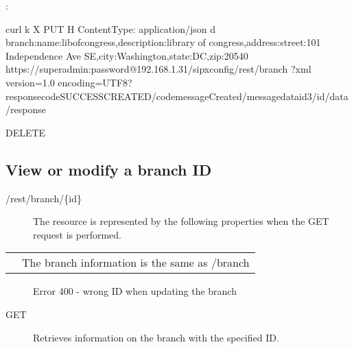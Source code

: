 \documentclass[letterpaper,10pt,english]{sphinxmanual}
\begin{document}
:

\begin{sphinxVerbatim}[commandchars=\\\{\}]
\PYGZsh{} curl \PYGZhy{}k \PYGZhy{}X PUT \PYGZhy{}H \PYGZdq{}Content\PYGZhy{}Type: application/json\PYGZdq{} \PYGZhy{}d \PYGZsq{}\PYGZob{}\PYGZdq{}branch\PYGZdq{}:\PYGZob{}\PYGZdq{}name\PYGZdq{}:\PYGZdq{}libofcongress\PYGZdq{},\PYGZdq{}description\PYGZdq{}:\PYGZdq{}library of congress\PYGZdq{},\PYGZdq{}address\PYGZdq{}:\PYGZob{}\PYGZdq{}street\PYGZdq{}:\PYGZdq{}101 Independence Ave SE\PYGZdq{},\PYGZdq{}city\PYGZdq{}:\PYGZdq{}Washington\PYGZdq{},\PYGZdq{}state\PYGZdq{}:\PYGZdq{}DC\PYGZdq{},\PYGZdq{}zip\PYGZdq{}:\PYGZdq{}20540\PYGZdq{}\PYGZcb{}\PYGZcb{}\PYGZcb{}\PYGZsq{}  https://superadmin:password@192.168.1.31/sipxconfig/rest/branch
\PYGZlt{}?xml version=\PYGZdq{}1.0\PYGZdq{} encoding=\PYGZdq{}UTF\PYGZhy{}8\PYGZdq{}?\PYGZgt{}\PYGZlt{}response\PYGZgt{}\PYGZlt{}code\PYGZgt{}SUCCESS\PYGZus{}CREATED\PYGZlt{}/code\PYGZgt{}\PYGZlt{}message\PYGZgt{}Created\PYGZlt{}/message\PYGZgt{}\PYGZlt{}data\PYGZgt{}\PYGZlt{}id\PYGZgt{}3\PYGZlt{}/id\PYGZgt{}\PYGZlt{}/data\PYGZgt{}\PYGZlt{}/response\PYGZgt{}
\end{sphinxVerbatim}

 DELETE


\subsection{View or modify a branch ID}
\label{\detokenize{restapi:view-or-modify-a-branch-id}}
 /rest/branch/\{id\}
\begin{description}
\item[{}] \leavevmode
The resource is represented by the following properties when the GET request is performed.

\end{description}


\begin{savenotes}\sphinxattablestart
\centering
\begin{tabulary}{\linewidth}[t]{|T|T|}
\hline

&
\\
\hline
{}
&
The branch information is the same as /branch
\\
\hline
\end{tabulary}
\par
\sphinxattableend\end{savenotes}
\begin{description}
\item[{}] \leavevmode
Error 400 - wrong ID when updating the branch

\item[{ GET}] \leavevmode
Retrieves information on the branch with the specified ID.

\end{description}
\end{document}
